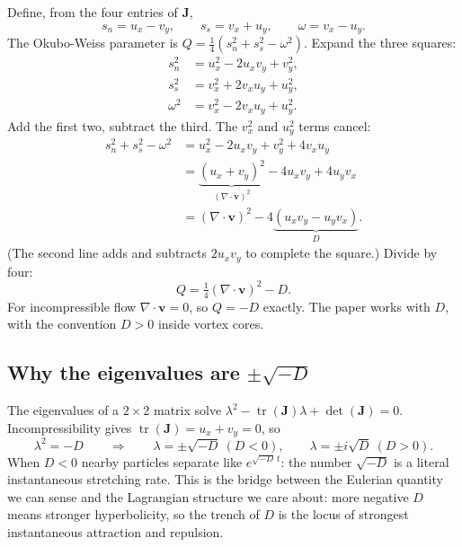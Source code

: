 \documentclass[11pt]{article}
\begin{document}
Define, from the four entries of $\mathbf{J}$,
\begin{equation}
s_n = u_x - v_y, \qquad s_s = v_x + u_y, \qquad \omega = v_x - u_y .
\end{equation}
The Okubo-Weiss parameter is $Q = \tfrac{1}{4}(s_n^2 + s_s^2 - \omega^2)$.
Expand the three squares:
\begin{align}
s_n^2 &= u_x^2 - 2u_xv_y + v_y^2, \\
s_s^2 &= v_x^2 + 2v_xu_y + u_y^2, \\
\omega^2 &= v_x^2 - 2v_xu_y + u_y^2 .
\end{align}
Add the first two, subtract the third. The $v_x^2$ and $u_y^2$ terms cancel:
\begin{align}
s_n^2 + s_s^2 - \omega^2
&= u_x^2 - 2u_xv_y + v_y^2 + 4v_xu_y \\
&= \underbrace{(u_x + v_y)^2}_{(\nabla\cdot\mathbf{v})^2}
 - 4u_xv_y + 4u_yv_x \\
&= (\nabla\cdot\mathbf{v})^2 - 4\underbrace{(u_xv_y - u_yv_x)}_{D} .
\end{align}
(The second line adds and subtracts $2u_xv_y$ to complete the square.)
Divide by four:
\begin{equation}
Q = \tfrac{1}{4}(\nabla\cdot\mathbf{v})^2 - D .
\end{equation}
For incompressible flow $\nabla\cdot\mathbf{v} = 0$, so $Q = -D$ exactly.
The paper works with $D$, with the convention $D > 0$ inside vortex cores.

\subsection{Why the eigenvalues are $\pm\sqrt{-D}$}

The eigenvalues of a $2\times2$ matrix solve
$\lambda^2 - \operatorname{tr}(\mathbf{J})\lambda + \det(\mathbf{J}) = 0$.
Incompressibility gives $\operatorname{tr}(\mathbf{J}) = u_x + v_y = 0$, so
\begin{equation}
\lambda^2 = -D
\qquad\Longrightarrow\qquad
\lambda = \pm\sqrt{-D} \ (D<0), \qquad \lambda = \pm i\sqrt{D} \ (D>0).
\end{equation}
When $D < 0$ nearby particles separate like $e^{\sqrt{-D}\,t}$: the number
$\sqrt{-D}$ is a literal instantaneous stretching rate. This is the bridge
between the Eulerian quantity we can sense and the Lagrangian structure we
care about: more negative $D$ means stronger hyperbolicity, so the trench of
$D$ is the locus of strongest instantaneous attraction and repulsion.
\end{document}
